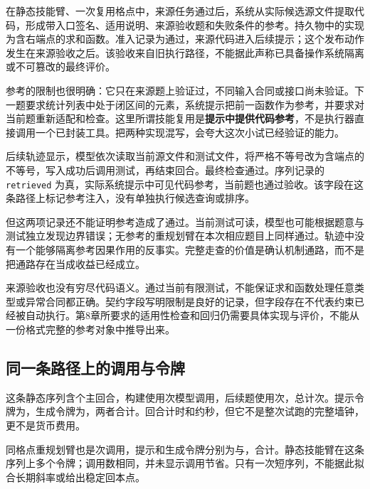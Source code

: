 在静态技能臂、一次复用格点中，来源任务通过后，系统从实际候选源文件提取代码，形成带入口签名、适用说明、来源验收题和失败条件的参考。持久物中的实现为含右端点的求和函数。准入记录为通过，来源代码进入后续提示；这个发布动作发生在来源验收之后。该验收来自旧执行路径，不能据此声称已具备操作系统隔离或不可篡改的最终评价。

参考的限制也很明确：它只在来源题上验证过，不同输入合同或接口尚未验证。下一题要求统计列表中处于闭区间的元素，系统提示把前一函数作为参考，并要求对当前题重新适配和检查。这里所谓技能复用是\textbf{提示中提供代码参考}，不是执行器直接调用一个已封装工具。把两种实现混写，会夸大这次小试已经验证的能力。

后续轨迹显示，模型依次读取当前源文件和测试文件，将严格不等号改为含端点的不等号，写入成功后调用测试，再结束回合。最终检查通过。序列记录的 \texttt{retrieved} 为真，实际系统提示中可见代码参考，当前题也通过验收。该字段在这条路径上标记参考注入，没有单独执行候选查询或排序。

但这两项记录还不能证明参考造成了通过。当前测试可读，模型也可能根据题意与测试独立发现边界错误；无参考的重规划臂在本次相应题目上同样通过。轨迹中没有一个能够隔离参考因果作用的反事实。完整走查的价值是确认机制通路，而不是把通路存在当成收益已经成立。

来源验收也没有穷尽代码语义。通过当前有限测试，不能保证求和函数处理任意类型或异常合同都正确。契约字段写明限制是良好的记录，但字段存在不代表约束已经被自动执行。第8章所要求的适用性检查和回归仍需要具体实现与评价，不能从一份格式完整的参考对象中推导出来。

\subsection{同一条路径上的调用与令牌}

\begin{sloppypar}
这条静态序列含个主回合，构建使用次模型调用，后续题使用次，总计次。提示令牌为，生成令牌为，两者合计。回合计时和约秒，但它不是整次试跑的完整墙钟，更不是货币费用。
\end{sloppypar}

\begin{sloppypar}
同格点重规划臂也是次调用，提示和生成令牌分别为与，合计。静态技能臂在这条序列上多个令牌；调用数相同，并未显示调用节省。只有一次短序列，不能据此拟合长期斜率或给出稳定回本点。
\end{sloppypar}

